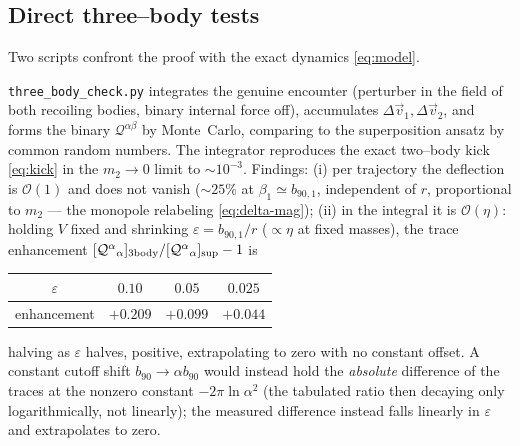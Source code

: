 \documentclass[11pt]{article}
\newcommand{\Q}{\mathcal Q}
\newcommand{\bnt}{b_{90}}
\newcommand{\order}[1]{\mathcal O\!\left(#1\right)}
\begin{document}
\subsection{Direct three--body tests}
\label{sec:numerics}
Two scripts confront the proof with the exact dynamics \eqref{eq:model}.

\texttt{three\_body\_check.py} integrates the genuine encounter (perturber in the field of both
recoiling bodies, binary internal force off), accumulates $\Delta\vec v_1,\Delta\vec v_2$, and forms
the binary $\Q^{\alpha\beta}$ by Monte~Carlo, comparing to the superposition ansatz by common random
numbers. The integrator reproduces the exact two--body kick \eqref{eq:kick} in the $m_2\to0$ limit
to $\sim10^{-3}$. Findings: (i) per trajectory the deflection is $\order1$ and does not vanish
($\sim25\%$ at $\beta_1\simeq b_{90,1}$, independent of $r$, proportional to $m_2$ --- the monopole
relabeling \eqref{eq:delta-mag}); (ii) in the integral it is $\order\eta$: holding $V$ fixed and
shrinking $\varepsilon=b_{90,1}/r$ ($\propto\eta$ at fixed masses), the trace enhancement
$[\Q^\alpha{}_\alpha]_{\rm 3body}/[\Q^\alpha{}_\alpha]_{\rm sup}-1$ is
\begin{center}\small
\begin{tabular}{c|ccc}
 $\varepsilon$ & $0.10$ & $0.05$ & $0.025$\\\hline
 enhancement & $+0.209$ & $+0.099$ & $+0.044$
\end{tabular}
\end{center}
halving as $\varepsilon$ halves, positive, extrapolating to zero with no constant offset. A
constant cutoff shift $\bnt\to\alpha\bnt$ would instead hold the \emph{absolute} difference of the
traces at the nonzero constant $-2\pi\ln\alpha^2$ (the tabulated ratio then decaying only
logarithmically, not linearly); the measured difference instead falls linearly in $\varepsilon$
and extrapolates to zero.
\end{document}
